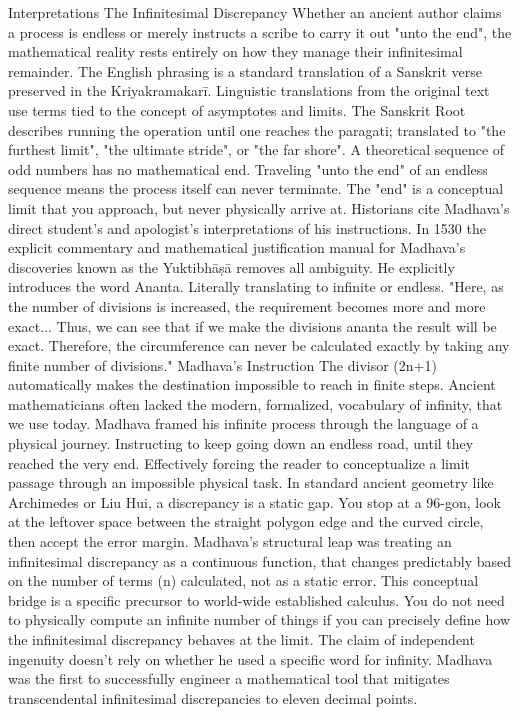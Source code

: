 {Interpretations
The Infinitesimal Discrepancy
Whether an ancient author claims a process is endless or merely instructs a scribe to carry it out "unto the end", the mathematical reality rests entirely on how they manage their infinitesimal remainder. The English phrasing is a standard translation of a Sanskrit verse preserved in the Kriyakramakarī. Linguistic translations from the original text use terms tied to the concept of asymptotes and limits. The Sanskrit Root describes running the operation until one reaches the paragati; translated to "the furthest limit", "the ultimate stride", or "the far shore". A theoretical sequence of odd numbers has no mathematical end. Traveling "unto the end" of an endless sequence means the process itself can never terminate. The "end" is a conceptual limit that you approach, but never physically arrive at. Historians cite Madhava's direct student’s and apologist’s interpretations of his instructions. In 1530 the explicit commentary and mathematical justification manual for Madhava's discoveries known as the Yuktibhāṣā removes all ambiguity. He explicitly introduces the word Ananta. Literally translating to infinite or endless. 
"Here, as the number of divisions is increased, the requirement becomes more and more exact... Thus, we can see that if we make the divisions ananta the result will be exact. Therefore, the circumference can never be calculated exactly by taking any finite number of divisions."
Madhava’s Instruction
The divisor (2n+1) automatically makes the destination impossible to reach in finite steps. Ancient mathematicians often lacked the modern, formalized, vocabulary of infinity, that we use today. Madhava framed his infinite process through the language of a physical journey. Instructing to keep going down an endless road, until they reached the very end. Effectively forcing the reader to conceptualize a limit passage through an impossible physical task. In standard ancient geometry like Archimedes or Liu Hui, a discrepancy is a static gap. You stop at a 96-gon, look at the leftover space between the straight polygon edge and the curved circle, then accept the error margin. Madhava’s structural leap was treating an infinitesimal discrepancy as a continuous function, that changes predictably based on the number of terms (n) calculated, not as a static error. This conceptual bridge is a specific precursor to world-wide established calculus. You do not need to physically compute an infinite number of things if you can precisely define how the infinitesimal discrepancy behaves at the limit. The claim of independent ingenuity doesn't rely on whether he used a specific word for infinity. Madhava was the first to successfully engineer a mathematical tool that mitigates transcendental infinitesimal discrepancies to eleven decimal points. 
}
